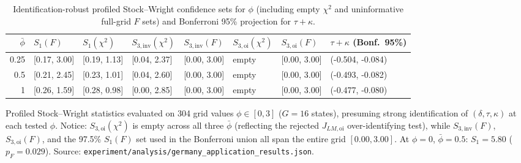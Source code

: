 \begin{table}[!t]
\centering
\caption{Identification-robust profiled Stock--Wright confidence sets for $\phi$ (including empty $\chi^2$ and uninformative full-grid $F$ sets) and Bonferroni 95\% projection for $\tau+\kappa$.}
\label{tab:rev-robust}
\footnotesize
\setlength{\tabcolsep}{2.4pt}
\begin{adjustbox}{max width=\linewidth}
\begin{tabular}{rlllllll}
\toprule
$\bar\phi$ & $S_1(F)$ & $S_1(\chi^2)$ & $S_{3,\mathrm{inv}}(\chi^2)$ & $S_{3,\mathrm{inv}}(F)$ & $S_{3,\mathrm{oi}}(\chi^2)$ & $S_{3,\mathrm{oi}}(F)$ & $\tau+\kappa$ (Bonf.\ 95\%) \\
\midrule
0.25 & [0.17, 3.00] & [0.19, 1.13] & [0.04, 2.37] & [0.00, 3.00] & empty & [0.00, 3.00] & (-0.504, -0.084) \\
0.5 & [0.21, 2.45] & [0.23, 1.01] & [0.04, 2.60] & [0.00, 3.00] & empty & [0.00, 3.00] & (-0.493, -0.082) \\
1 & [0.26, 1.59] & [0.28, 0.98] & [0.00, 2.85] & [0.00, 3.00] & empty & [0.00, 3.00] & (-0.477, -0.080) \\
\bottomrule
\end{tabular}
\end{adjustbox}
\par\smallskip\parbox{\linewidth}{\scriptsize Profiled Stock--Wright statistics evaluated on 304 grid values $\phi\in[0,3]$ ($G=16$ states), presuming strong identification of $(\delta,\tau,\kappa)$ at each tested $\phi$. Notice: $S_{3,\mathrm{oi}}(\chi^2)$ is empty across all three $\bar\phi$ (reflecting the rejected $J_{LM,\mathrm{oi}}$ over-identifying test), while $S_{3,\mathrm{inv}}(F)$, $S_{3,\mathrm{oi}}(F)$, and the 97.5\% $S_1(F)$ set used in the Bonferroni union all span the entire grid $[0.00,3.00]$. At $\phi=0$, $\bar\phi=0.5$: $S_1=5.80$ ($p_F=0.029$). Source: \texttt{experiment/analysis/germany\_application\_results.json}.}
\end{table}

